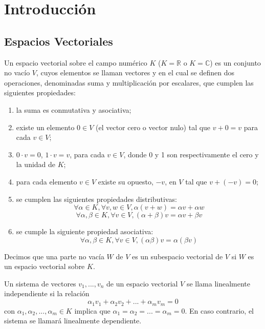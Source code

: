 \chapter{Introducción}
\section{Espacios Vectoriales}
\begin{definition}
    Un espacio vectorial sobre el campo num\'erico $K$ ($K = \mathbb{R}$ o $K = \mathbb{C}$) es un conjunto no vacío $V$, cuyos elementos se llaman vectores y en el cual se definen dos operaciones, denominadas suma y multiplicaci\'on por escalares, que cumplen las siguientes propiedades:
    \begin{enumerate}
        \item la suma es conmutativa y asociativa;
        \item existe un elemento $0 \in V$ (el vector cero o vector nulo) tal que $v + 0 = v$ para cada $v \in V$;
        \item $0 \cdot v = 0$, $1 \cdot v = v$, para cada $v \in V$, donde 0 y 1 son respectivamente el cero y la unidad de $K$;
        \item para cada elemento $v \in V$ existe su opuesto, $-v$, en $V$ tal que $v + (-v) = 0$;
        \item se cumplen las siguientes propiedades distributivas:
        \[\forall \alpha \in K, \forall v,w \in V, \alpha(v + w) = \alpha v + \alpha w\]
        \[\forall \alpha , \beta \in K, \forall v \in V, (\alpha + \beta)v = \alpha v + \beta v\]
        \item se cumple la siguiente propiedad asociativa:
        \[\forall \alpha , \beta \in K, \forall v \in V, (\alpha \beta)v = \alpha (\beta v)\]
    \end{enumerate}
\end{definition}

\begin{definition}
    Decimos que una parte no vac\'ia $W$ de $V$ es un subespacio vectorial de $V$ si $W$ es un espacio vectorial sobre $K$.
\end{definition}

\begin{definition}
    Un sistema de vectores ${v_1, ..., v_n}$ de un espacio vectorial $V$ se llama linealmente independiente si la relaci\'on
    \[\alpha_1 v_1 + \alpha_2 v_2 +...+ \alpha_m v_m = 0\]
    con $\alpha_1, \alpha_2, ..., \alpha_m \in K$ implica que $\alpha_1 = \alpha_2 = ...= \alpha_m = 0$. En caso contrario, el sistema se llamar\'a linealmente dependiente.
\end{definition}

